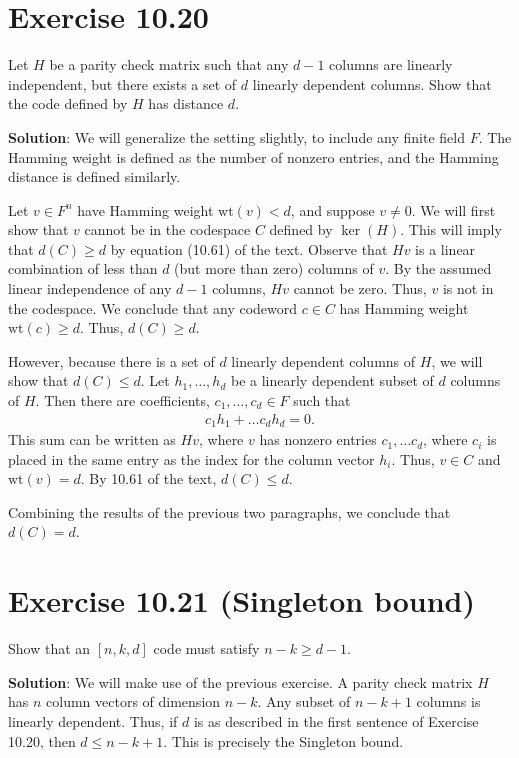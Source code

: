 \documentclass{book}
\begin{document}
\section*{Exercise 10.20}
    Let $H$ be a parity check matrix such that any $d - 1$ columns are linearly independent, but there exists a set of $d$ linearly dependent columns. Show that the code defined by $H$ has distance $d$. 

    \textbf{Solution}: We will generalize the setting slightly, to include any finite field $F$. The Hamming weight is defined as the number of nonzero entries, and the Hamming distance is defined similarly. 
    
    Let $v \in F^n$ have Hamming weight $\mathrm{wt}(v) < d$, and suppose $v \neq 0$. We will first show that $v$ cannot be in the codespace $C$ defined by $\ker(H)$. This will imply that $d(C) \geq d$ by equation (10.61) of the text. Observe that $Hv$ is a linear combination of less than $d$ (but more than zero) columns of $v$. By the assumed linear independence of any $d-1$ columns, $Hv$ cannot be zero. Thus, $v$ is not in the codespace. We conclude that any codeword $c \in C$ has Hamming weight $\mathrm{wt}(c) \geq d$. Thus, $d(C) \geq d$.

    However, because there is a set of $d$ linearly dependent columns of $H$, we will show that $d(C) \leq d$. Let $h_1, \dots, h_d$ be a linearly dependent subset of $d$ columns of $H$. Then there are coefficients, $c_1, \dots, c_d \in F$ such that 
    \begin{align}
        c_1 h_1 + \dots c_d h_d = 0.
    \end{align}
    This sum can be written as $Hv$, where $v$ has nonzero entries $c_1, \dots c_d$, where $c_i$ is placed in the same entry as the index for the column vector $h_i$. Thus, $v \in C$ and $\mathrm{wt}(v) = d$. By 10.61 of the text, $d(C) \leq d$.

    Combining the results of the previous two paragraphs, we conclude that $d(C) = d$. 

\section*{Exercise 10.21 (Singleton bound)}
    Show that an $[n, k, d]$ code must satisfy $n-k \geq d-1$. 

    \textbf{Solution}: We will make use of the previous exercise. A parity check matrix $H$ has $n$ column vectors of dimension $n - k$. Any subset of $n - k + 1$ columns is linearly dependent. Thus, if $d$ is as described in the first sentence of Exercise 10.20, then $d \leq n-k + 1$. This is precisely the Singleton bound.
\end{document}

